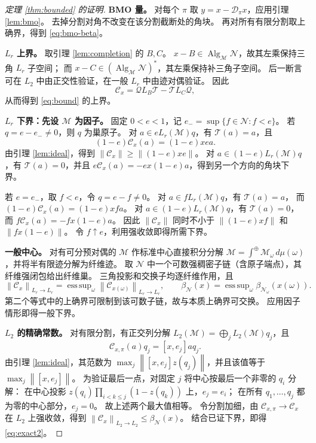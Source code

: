 \documentclass[UTF8,11pt,a4paper,fontset=fandol]{ctexart}
\theoremstyle{remark}
\numberwithin{equation}{section}
\newcommand{\M}{\mathcal M}
\newcommand{\N}{\mathcal N}
\newcommand{\Alg}{\operatorname{Alg}_{\M}\N}
\newcommand{\T}{\mathcal T}
\newcommand{\Q}{\mathcal Q}
\newcommand{\D}{\mathcal D}
\newcommand{\CC}{\mathcal C}
\newcommand{\norm}[1]{\left\lVert #1\right\rVert}
\DeclareMathOperator{\esssup}{ess\,sup}
\begin{document}
\begin{proof}[定理 \ref{thm:bounded} 的证明]
\textbf{BMO 量。}
对每个 $\pi$ 取 $y=x-\D_\pi x$，应用引理 \ref{lem:bmo}。
去掉分割对角不改变在该分割截断处的角块。
再对所有有限分割取上确界，得到 \eqref{eq:bmo-beta}。

\medskip
\textbf{$L_r$ 上界。}
取引理 \ref{lem:completion} 的 $B,C$。
$x-B\in\Alg$，故其左乘保持三角 $L_r$ 子空间；
而 $x-C\in(\Alg)^*$，其左乘保持补三角子空间。
后一断言可在 $L_2$ 中由正交性验证，在一般 $L_r$ 中由迹对偶验证。
因此
\begin{equation}\label{eq:factorization}
 \CC_x=\Q L_B\T-\T L_C\Q,
\end{equation}
从而得到 \eqref{eq:bound} 的上界。

\medskip
\textbf{$L_r$ 下界：先设 $\M$ 为因子。}
固定 $0<e<1$，记 $e_- =\sup\{f\in\N:f<e\}$。
若 $q=e-e_-\ne0$，则 $q$ 为巢原子。
对 $a\in eL_r(\M)q$，有 $\T(a)=a$，且
\[
 (1-e)\CC_x(a)=(1-e)xea.
\]
由引理 \ref{lem:ideal}，得到
$\norm{\CC_x}\geq\norm{(1-e)xe}$。
对 $a\in(1-e)L_r(\M)q$，有 $\T(a)=0$，并且
$e\CC_x(a)=-ex(1-e)a$，得到另一个方向的角块下界。

若 $e=e_-$，取 $f<e$，令 $q=e-f\ne0$。
对 $a\in fL_r(\M)q$，有 $\T(a)=a$，
而 $(1-e)\CC_x(a)=(1-e)xfa$。
对 $a\in(1-e)L_r(\M)q$，有 $\T(a)=0$，而
$f\CC_x(a)=-fx(1-e)a$。
因此 $\norm{\CC_x}$ 同时不小于
$\norm{(1-e)xf}$ 和 $\norm{fx(1-e)}$。
令 $f\uparrow e$，利用强收敛即得所需下界。

\medskip
\textbf{一般中心。}
对有可分预对偶的 $\M$ 作标准中心直接积分分解
$\M=\int^\oplus\M_\omega\,d\mu(\omega)$，并将半有限迹分解为纤维迹。
取 $\N$ 中一个可数强稠密子链（含原子端点），其纤维强闭包给出纤维巢。
三角投影和交换子均逐纤维作用，且
\[
 \norm{\CC_x}_{L_r\to L_r}
 =\esssup_\omega\norm{\CC_{x(\omega)}}_{L_r\to L_r},\qquad
 \beta_\N(x)=\esssup_\omega\beta_{\N_\omega}(x(\omega)).
\]
第二个等式中的上确界可限制到该可数子链，故与本质上确界可交换。
应用因子情形即得一般下界。

\medskip
\textbf{$L_2$ 的精确常数。}
对有限分割，有正交列分解 $L_2(\M)=\bigoplus_jL_2(\M)q_j$，且
\[
 \CC_{x,\pi}(a)q_j=[x,e_j]a q_j.
\]
由引理 \ref{lem:ideal}，其范数为
$\max_j\norm{[x,e_j]z(q_j)}$，并且该值等于 $\max_j\norm{[x,e_j]}$。
为验证最后一点，对固定 $j$ 将中心按最后一个非零的 $q_i$ 分解：
在中心投影
$z(q_i)\prod_{i<k\leq j}(1-z(q_k))$ 上，$e_j=e_i$；
在所有 $q_1,\ldots,q_j$ 都为零的中心部分，$e_j=0$。
故上述两个最大值相等。
令分割加细，由 $\CC_{x,\pi}\to\CC_x$ 在 $L_2$ 上强收敛，得到
$\norm{\CC_x}_{L_2\to L_2}\leq\beta_\N(x)$。
结合已证下界，即得 \eqref{eq:exact2}。
\end{proof}
\end{document}
